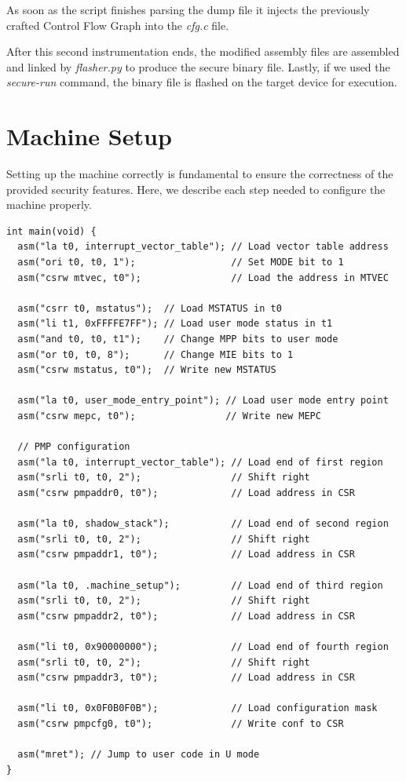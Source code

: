 As soon as the script finishes parsing the dump file it injects the previously crafted
Control Flow Graph into the \textit{cfg.c} file.

After this second instrumentation ends, the modified assembly files are assembled
and linked by \textit{flasher.py} to produce the secure binary file. Lastly, if
we used the \textit{secure-run} command, the binary file is flashed on the
target device for execution.

\section{Machine Setup}
\label{sec:project_setup}

Setting up the machine correctly is fundamental to ensure the correctness of the
provided security features. Here, we describe each step needed to configure the machine
properly. \\
\begin{lstlisting}[style=CStyle, caption = Machine setup, label={lst:setup}]
int main(void) {
  asm("la t0, interrupt_vector_table"); // Load vector table address
  asm("ori t0, t0, 1");                 // Set MODE bit to 1
  asm("csrw mtvec, t0");                // Load the address in MTVEC

  asm("csrr t0, mstatus");  // Load MSTATUS in t0
  asm("li t1, 0xFFFFE7FF"); // Load user mode status in t1
  asm("and t0, t0, t1");    // Change MPP bits to user mode
  asm("or t0, t0, 8");      // Change MIE bits to 1
  asm("csrw mstatus, t0");  // Write new MSTATUS

  asm("la t0, user_mode_entry_point"); // Load user mode entry point
  asm("csrw mepc, t0");                // Write new MEPC

  // PMP configuration
  asm("la t0, interrupt_vector_table"); // Load end of first region
  asm("srli t0, t0, 2");                // Shift right
  asm("csrw pmpaddr0, t0");             // Load address in CSR

  asm("la t0, shadow_stack");           // Load end of second region
  asm("srli t0, t0, 2");                // Shift right
  asm("csrw pmpaddr1, t0");             // Load address in CSR

  asm("la t0, .machine_setup");         // Load end of third region
  asm("srli t0, t0, 2");                // Shift right
  asm("csrw pmpaddr2, t0");             // Load address in CSR

  asm("li t0, 0x90000000");             // Load end of fourth region
  asm("srli t0, t0, 2");                // Shift right
  asm("csrw pmpaddr3, t0");             // Load address in CSR

  asm("li t0, 0x0F0B0F0B");             // Load configuration mask
  asm("csrw pmpcfg0, t0");              // Write conf to CSR

  asm("mret"); // Jump to user code in U mode
}
\end{lstlisting}

